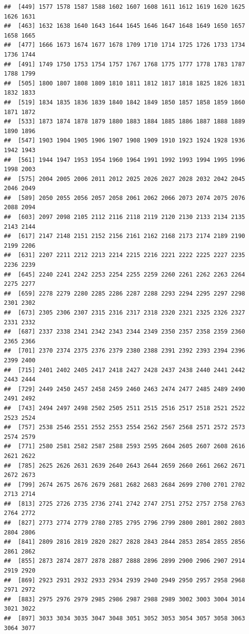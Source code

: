 \documentclass[]{article}
\begin{document}
\begin{verbatim}
##  [449] 1577 1578 1587 1588 1602 1607 1608 1611 1612 1619 1620 1625 1626 1631
##  [463] 1632 1638 1640 1643 1644 1645 1646 1647 1648 1649 1650 1657 1658 1665
##  [477] 1666 1673 1674 1677 1678 1709 1710 1714 1725 1726 1733 1734 1736 1744
##  [491] 1749 1750 1753 1754 1757 1767 1768 1775 1777 1778 1783 1787 1788 1799
##  [505] 1800 1807 1808 1809 1810 1811 1812 1817 1818 1825 1826 1831 1832 1833
##  [519] 1834 1835 1836 1839 1840 1842 1849 1850 1857 1858 1859 1860 1871 1872
##  [533] 1873 1874 1878 1879 1880 1883 1884 1885 1886 1887 1888 1889 1890 1896
##  [547] 1903 1904 1905 1906 1907 1908 1909 1910 1923 1924 1928 1936 1942 1943
##  [561] 1944 1947 1953 1954 1960 1964 1991 1992 1993 1994 1995 1996 1998 2003
##  [575] 2004 2005 2006 2011 2012 2025 2026 2027 2028 2032 2042 2045 2046 2049
##  [589] 2050 2055 2056 2057 2058 2061 2062 2066 2073 2074 2075 2076 2088 2094
##  [603] 2097 2098 2105 2112 2116 2118 2119 2120 2130 2133 2134 2135 2143 2144
##  [617] 2147 2148 2151 2152 2156 2161 2162 2168 2173 2174 2189 2190 2199 2206
##  [631] 2207 2211 2212 2213 2214 2215 2216 2221 2222 2225 2227 2235 2236 2239
##  [645] 2240 2241 2242 2253 2254 2255 2259 2260 2261 2262 2263 2264 2275 2277
##  [659] 2278 2279 2280 2285 2286 2287 2288 2293 2294 2295 2297 2298 2301 2302
##  [673] 2305 2306 2307 2315 2316 2317 2318 2320 2321 2325 2326 2327 2331 2332
##  [687] 2337 2338 2341 2342 2343 2344 2349 2350 2357 2358 2359 2360 2365 2366
##  [701] 2370 2374 2375 2376 2379 2380 2388 2391 2392 2393 2394 2396 2399 2400
##  [715] 2401 2402 2405 2417 2418 2427 2428 2437 2438 2440 2441 2442 2443 2444
##  [729] 2449 2450 2457 2458 2459 2460 2463 2474 2477 2485 2489 2490 2491 2492
##  [743] 2494 2497 2498 2502 2505 2511 2515 2516 2517 2518 2521 2522 2523 2524
##  [757] 2538 2546 2551 2552 2553 2554 2562 2567 2568 2571 2572 2573 2574 2579
##  [771] 2580 2581 2582 2587 2588 2593 2595 2604 2605 2607 2608 2616 2621 2622
##  [785] 2625 2626 2631 2639 2640 2643 2644 2659 2660 2661 2662 2671 2672 2673
##  [799] 2674 2675 2676 2679 2681 2682 2683 2684 2699 2700 2701 2702 2713 2714
##  [813] 2725 2726 2735 2736 2741 2742 2747 2751 2752 2757 2758 2763 2764 2772
##  [827] 2773 2774 2779 2780 2785 2795 2796 2799 2800 2801 2802 2803 2804 2806
##  [841] 2809 2816 2819 2820 2827 2828 2843 2844 2853 2854 2855 2856 2861 2862
##  [855] 2873 2874 2877 2878 2887 2888 2896 2899 2900 2906 2907 2914 2919 2920
##  [869] 2923 2931 2932 2933 2934 2939 2940 2949 2950 2957 2958 2968 2971 2972
##  [883] 2975 2976 2979 2985 2986 2987 2988 2989 3002 3003 3004 3014 3021 3022
##  [897] 3033 3034 3035 3047 3048 3051 3052 3053 3054 3057 3058 3063 3064 3077

\end{verbatim}
\end{document}
